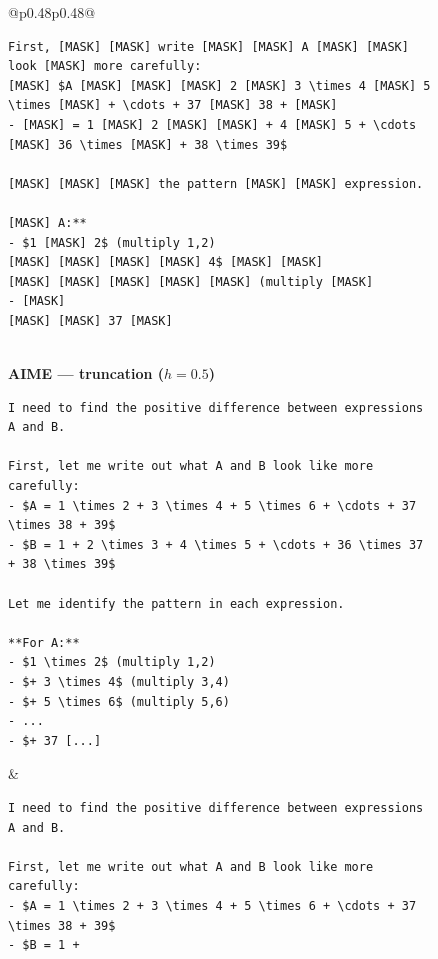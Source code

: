 \begin{figure}[p]
\begin{tabular}{@{}p{}p{}@{}}
\begin{tcolorbox}
\begin{lstlisting}
First, [MASK] [MASK] write [MASK] [MASK] A [MASK] [MASK] look [MASK] more carefully:
[MASK] $A [MASK] [MASK] [MASK] 2 [MASK] 3 \times 4 [MASK] 5 \times [MASK] + \cdots + 37 [MASK] 38 + [MASK]
- [MASK] = 1 [MASK] 2 [MASK] [MASK] + 4 [MASK] 5 + \cdots [MASK] 36 \times [MASK] + 38 \times 39$

[MASK] [MASK] [MASK] the pattern [MASK] [MASK] expression.

[MASK] A:**
- $1 [MASK] 2$ (multiply 1,2)
[MASK] [MASK] [MASK] [MASK] 4$ [MASK] [MASK]
[MASK] [MASK] [MASK] [MASK] [MASK] (multiply [MASK]
- [MASK]
[MASK] [MASK] 37 [MASK]
\end{lstlisting}
\end{tcolorbox} \\[6pt]
\textbf{\sffamily\small AIME --- truncation ($h = 0.5$)} \\[2pt]
\begin{tcolorbox}[
    colback=gray!3, colframe=blue!60!black, boxrule=0.5pt,
    title={\scriptsize\textbf{full hint}},
    fonttitle=\sffamily, coltitle=white, colbacktitle=blue!60!black,
    left=3pt, right=3pt, top=1pt, bottom=1pt
]
\begin{lstlisting}
I need to find the positive difference between expressions A and B.

First, let me write out what A and B look like more carefully:
- $A = 1 \times 2 + 3 \times 4 + 5 \times 6 + \cdots + 37 \times 38 + 39$
- $B = 1 + 2 \times 3 + 4 \times 5 + \cdots + 36 \times 37 + 38 \times 39$

Let me identify the pattern in each expression.

**For A:**
- $1 \times 2$ (multiply 1,2)
- $+ 3 \times 4$ (multiply 3,4)
- $+ 5 \times 6$ (multiply 5,6)
- ...
- $+ 37 [...]
\end{lstlisting}
\end{tcolorbox} & \begin{tcolorbox}[
    colback=gray!3, colframe=red!60!black, boxrule=0.5pt,
    title={\scriptsize\textbf{truncation applied}},
    fonttitle=\sffamily, coltitle=white, colbacktitle=red!60!black,
    left=3pt, right=3pt, top=1pt, bottom=1pt
]
\begin{lstlisting}
I need to find the positive difference between expressions A and B.

First, let me write out what A and B look like more carefully:
- $A = 1 \times 2 + 3 \times 4 + 5 \times 6 + \cdots + 37 \times 38 + 39$
- $B = 1 +
\end{lstlisting}
\end{tcolorbox} \\[6pt]
\end{tabular}
\end{figure}